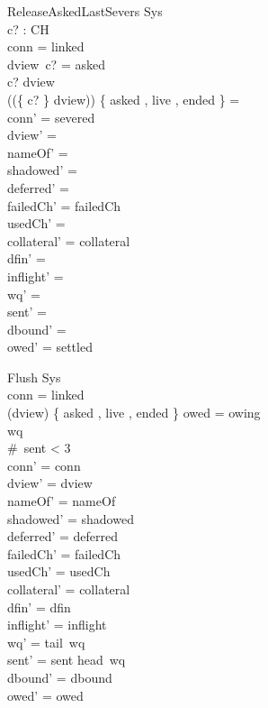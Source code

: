 \documentclass[a4paper,10pt,fleqn]{article}
\begin{document}
\begin{schema}{ReleaseAskedLastSevers}
  \Delta Sys \\
  c? : CH \\
\where
  conn = linked \\
  dview~c? = asked \\
  c? \in \dom dview \\
  (\ran (\{ c? \} \ndres dview)) \cap \{ asked , live , ended \} = \emptyset \\
  conn' = severed \\
  dview' = \emptyset \\
  nameOf' = \emptyset \\
  shadowed' = \emptyset \\
  deferred' = \emptyset \\
  failedCh' = failedCh \\
  usedCh' = \emptyset \\
  collateral' = collateral \\
  dfin' = \emptyset \\
  inflight' = \langle \rangle \\
  wq' = \langle \rangle \\
  sent' = \langle \rangle \\
  dbound' = \emptyset \\
  owed' = settled
\end{schema}

\begin{schema}{Flush}
  \Delta Sys \\
\where
  conn = linked \\
  (\ran dview) \cap \{ asked , live , ended \} \neq \emptyset \lor owed = owing \\
  wq \neq \langle \rangle \\
  \#~sent < 3 \\
  conn' = conn \\
  dview' = dview \\
  nameOf' = nameOf \\
  shadowed' = shadowed \\
  deferred' = deferred \\
  failedCh' = failedCh \\
  usedCh' = usedCh \\
  collateral' = collateral \\
  dfin' = dfin \\
  inflight' = inflight \\
  wq' = tail~wq \\
  sent' = sent \cat \langle head~wq \rangle \\
  dbound' = dbound \\
  owed' = owed
\end{schema}
\end{document}
